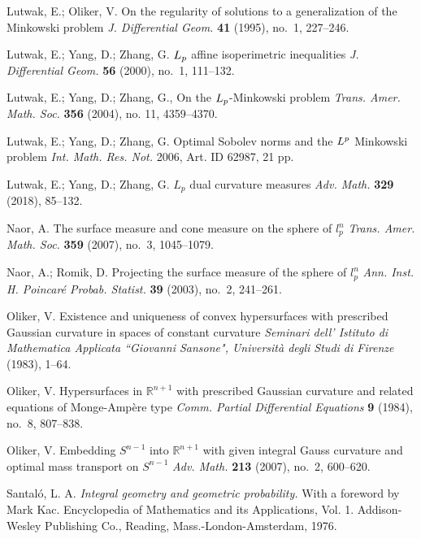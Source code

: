 \documentclass{cpamart1}     %
\theoremstyle{definition}
\theoremstyle{remark}
\newcommand{\sn}{S^{n-1}}
\begin{document}
\begin{thebibliography}{99}
Lutwak, E.; Oliker, V.
On the regularity of solutions to a generalization of the Minkowski problem
\textit{J. Differential Geom.} 
\textbf{41} (1995), no.\ 1, 227--246.


Lutwak, E.; Yang, D.; Zhang, G.
${L}\sb p$ affine isoperimetric inequalities
\textit{J. Differential Geom.} 
\textbf{56} (2000), no.\ 1, 111--132.

Lutwak, E.; Yang, D.; Zhang, G.,
On the $L\sb p$-Minkowski problem
\textit{Trans. Amer. Math. Soc.} 
\textbf{356} (2004),  no. 11, 4359--4370.


Lutwak, E.; Yang, D.; Zhang, G.
Optimal Sobolev norms and the $L\sp p$ Minkowski problem
\textit{Int. Math. Res. Not.}
2006, Art. ID 62987, 21 pp.


Lutwak, E.; Yang, D.; Zhang, G.
$L_p$ dual curvature measures
\textit{Adv. Math.} 
\textbf{329} (2018), 85--132.


Naor, A.
The surface measure and cone measure on the sphere of $l^n_p$
\textit{Trans. Amer. Math. Soc.}
\textbf{359} (2007), no.\ 3, 1045--1079.

Naor, A.; Romik, D.
Projecting the surface measure of the sphere of $l^n_p$
\textit{Ann. Inst. H. Poincar\'e Probab. Statist.}
\textbf{39} (2003), no.\ 2, 241--261.




Oliker, V. 
Existence and uniqueness of convex hypersurfaces with prescribed
Gaussian curvature in spaces of constant curvature
\textit{Seminari dell' Istituto di Mathematica Applicata ``Giovanni Sansone", Universit\`a degli Studi di Firenze} 
(1983), 1--64.

Oliker, V.
Hypersurfaces in $\mathbb R^{n+1}$ with prescribed Gaussian curvature and related equations of Monge-Amp\` ere type 
\textit{Comm. Partial Differential Equations}
\textbf{9} (1984), no.\ 8, 807--838.

Oliker, V.
Embedding $\sn$ into $\mathbb R^{n+1}$ with given integral Gauss curvature
and optimal mass transport on $\sn$
\textit{Adv. Math.}
\textbf{213} (2007), no.\ 2, 600--620.



Santal\'o, L. A. 
\textit{Integral geometry and geometric probability.} With a foreword by Mark Kac. Encyclopedia of Mathematics and its Applications, Vol. 1. 
Addison-Wesley Publishing Co., 
Reading, Mass.-London-Amsterdam, 1976.




\end{thebibliography}
\end{document}
